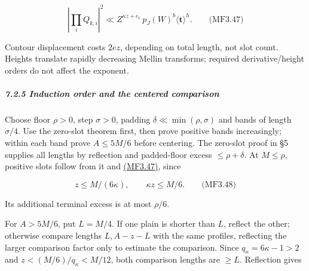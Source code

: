 \hypertarget{mf:eq:B3.47}{}

\label{mf:eq:B3.47}

\[
\left|\prod_iQ_{k,i}\right|^2
 \ll Z^{\kappa z+\epsilon_1}\,p_J(W)^b\langle\mathbf t\rangle^h.
\qquad\text{(MF3.47)}
\]

Contour displacement costs \(2ez\), depending on total length, not slot count. Heights translate rapidly decreasing Mellin transforms; required derivative/height orders do not affect the exponent.

\hypertarget{induction-order-and-the-centered-comparison}{}

\label{induction-order-and-the-centered-comparison}

\hypertarget{induction-order-and-the-centered-comparison-heading-2}{%
\subparagraph{7.2.5 Induction order and the centered comparison}}

Choose floor \(\rho>0\), step \(\sigma>0\), padding \(\delta\ll\min(\rho,\sigma)\) and bands of length \(\sigma/4\). Use the zero-slot theorem first, then prove positive bands increasingly; within each band prove \(A\le5M/6\) before centering. The zero-slot proof in §5 supplies all lengths by reflection and padded-floor excess \(\le\rho+\delta\). At \(M\le\rho\), positive slots follow from it and \protect\hyperlink{mf:eq:B3.47}{(MF3.47)}, since

\hypertarget{mf:eq:B3.48}{}

\label{mf:eq:B3.48}

\[
z\le M/(6\kappa),\qquad\kappa z\le M/6.
\qquad\text{(MF3.48)}
\]

Its additional terminal excess is at most \(\rho/6\).

For \(A>5M/6\), put \(L=M/4\). If one plain is shorter than \(L\), reflect the other; otherwise compare lengths \(L,A-z-L\) with the same profiles, reflecting the larger comparison factor only to estimate the comparison. Since \(q_\kappa=6\kappa-1>2\) and \(z<(M/6)/q_\kappa<M/12\), both comparison lengths are \(\ge L\). Reflection gives

\hypertarget{mf:eq:B3.49}{}

\label{mf:eq:B3.49}

\par\noindent\resizebox{\linewidth}{!}{\begin{minipage}{\dimexpr\linewidth+61.41724pt\relax}\[
A_{\rm comp}\le3M/2-A+2z+\xi,
\quad
\min\{5M/6-A_{\rm comp},\,M-A_{\rm comp}-q_\kappa z\}
\ge \mathfrak m(7/10)M-\xi,
\quad
\mathfrak m(\kappa)=\frac{2\kappa-1}{2(6\kappa-1)}.
\qquad\text{(MF3.49)}
\]\end{minipage}}\par

